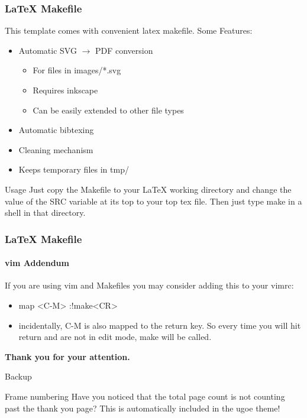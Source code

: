 \documentclass[10pt]{beamer}
\begin{document}
\begin{frame}
  \frametitle{\LaTeX{} Makefile}
  This template comes with convenient latex makefile. Some Features:
  \begin{itemize}
    \item 
      Automatic SVG $\rightarrow$ PDF conversion
      \begin{itemize}
        \item 
          For files in images/*.svg
        \item
          Requires inkscape
        \item
          Can be easily extended to other file types
      \end{itemize}
    \item
      Automatic bibtexing
    \item
      Cleaning mechanism
    \item
      Keeps temporary files in tmp/
  \end{itemize}
  \begin{exampleblock}{Usage}
    Just copy the Makefile to your \LaTeX{} working directory and change
    the value of the SRC variable at its top to your top tex file. Then
    just type make in a shell in that directory.
  \end{exampleblock}
\end{frame}

\begin{frame}
  \frametitle{\LaTeX{} Makefile}
  \framesubtitle{vim Addendum}
  If you are using vim and Makefiles you may consider adding this to your 
  vimrc:
  \begin{itemize}
    \item 
      map <C-M> :!make<CR>
    \item
      incidentally, C-M is also mapped to the return key. So every time
      you will hit return and are not in edit mode, make will be called.
  \end{itemize}
\end{frame}

\appendix
\begin{frame}[plain]
  \ugoeAddLogo
  \begin{center}
    \textbf{\Large Thank you for your attention.}
  \end{center}
\end{frame}

\begin{frame}
  \ugoeAddLogo
  \begin{center}
    \Huge Backup
  \end{center}
\end{frame}

\begin{frame}
  \begin{alertblock}{Frame numbering}
    Have you noticed that the total page count is not counting past the thank 
    you page? This is automatically included in the ugoe theme!
  \end{alertblock}
\end{frame}
\end{document}
